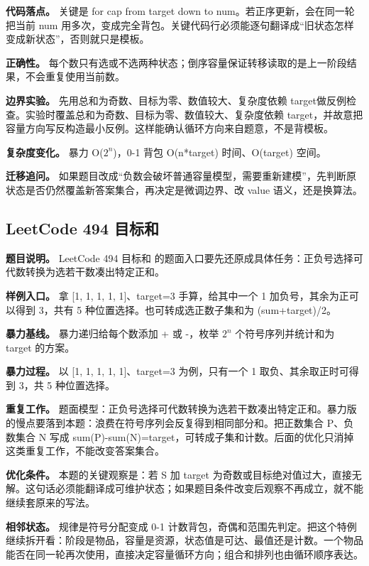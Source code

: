 \textbf{代码落点。} 关键是 for cap from target down to num。若正序更新，会在同一轮把当前 num 用多次，变成完全背包。关键代码行必须能逐句翻译成“旧状态怎样变成新状态”，否则就只是模板。

\textbf{正确性。} 每个数只有选或不选两种状态；倒序容量保证转移读取的是上一阶段结果，不会重复使用当前数。

\textbf{边界实验。} 先用总和为奇数、目标为零、数值较大、复杂度依赖 target做反例检查。实验时覆盖总和为奇数、目标为零、数值较大、复杂度依赖 target，并故意把容量方向写反构造最小反例。这样能确认循环方向来自题意，不是背模板。

\textbf{复杂度变化。} 暴力 O(\ensuremath{2^{n}})，0-1 背包 O(n*target) 时间、O(target) 空间。

\textbf{迁移追问。} 如果题目改成“负数会破坏普通容量模型，需要重新建模”，先判断原状态是否仍然覆盖新答案集合，再决定是微调边界、改 value 语义，还是换算法。

\subsection{LeetCode 494 目标和}

\textbf{题目说明。} LeetCode 494 目标和 的题面入口要先还原成具体任务：正负号选择可代数转换为选若干数凑出特定正和。

\textbf{样例入口。} 拿 [1, 1, 1, 1, 1]、target=3 手算，给其中一个 1 加负号，其余为正可以得到 3，共有 5 种位置选择。也可转成选正数子集和为 (sum+target)/2。

\textbf{暴力基线。} 暴力递归给每个数添加 + 或 -，枚举 \ensuremath{2^{n}} 个符号序列并统计和为 target 的方案。

\textbf{暴力过程。} 以 [1, 1, 1, 1, 1]、target=3 为例，只有一个 1 取负、其余取正时可得到 3，共 5 种位置选择。

\textbf{重复工作。} 题面模型：正负号选择可代数转换为选若干数凑出特定正和。暴力版的慢点要落到本题：浪费在符号序列会反复得到相同部分和。把正数集合 P、负数集合 N 写成 sum(P)-sum(N)=target，可转成子集和计数。后面的优化只消掉这类重复工作，不能改变答案集合。

\textbf{优化条件。} 本题的关键观察是：若 S 加 target 为奇数或目标绝对值过大，直接无解。这句话必须能翻译成可维护状态；如果题目条件改变后观察不再成立，就不能继续套原来的写法。

\textbf{相邻状态。} 规律是符号分配变成 0-1 计数背包，奇偶和范围先判定。把这个特例继续拆开看：阶段是物品，容量是资源，状态值是可达、最值还是计数。一个物品能否在同一轮再次使用，直接决定容量循环方向；组合和排列也由循环顺序表达。

